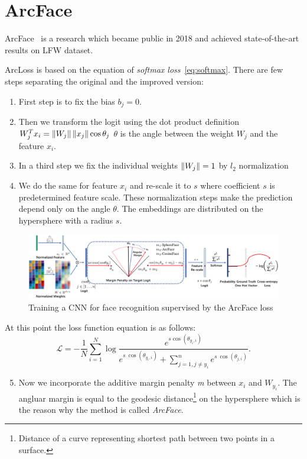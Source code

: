 \chapter{ArcFace}\label{ch:arcface}
ArcFace~\cite{ArcFace} is a research which became public in 2018 and achieved state-of-the-art results on LFW dataset.

ArcLoss is based on the equation of \textit{softmax loss}~\ref{eq:softmax}.
There are few steps separating the original and the improved version:
\begin{enumerate}
    \item First step is to fix the bias $b_j = 0$.
    \item Then we transform the logit using the dot product definition $W_j^T x_i = \left\lVert W_j\right\rVert \left\lVert x_j\right\rVert \cos \theta_j$
    $\theta$ is the angle between the weight $W_j$ and the feature $x_i$.
    \item In a third step we fix the individual weights $\left\lVert W_j\right\rVert = 1$ by $l_2$ normalization
    \item We do the same for feature $x_i$ and re-scale it to $s$ where coefficient $s$ is predetermined feature scale.
    These normalization steps make the prediction depend only on the angle $\theta$.
    The embeddings are distributed on the hypersphere with a radius $s$.
\end{enumerate}

\begin{figure}[H]
    \centering
    \includegraphics[width=\columnwidth]{images/arcface/arcface.png}
    \caption{Training a CNN for face recognition supervised by the ArcFace loss~\cite{ArcFace}}
    \label{fig:arcface}
\end{figure}

At this point the loss function equation is as follows:
\begin{equation}
    \mathcal{L} = -\frac{1}{N} \sum_{i=1}^{N} \log \frac{e^{s \cos(\theta_{y_i,i})}}
    {e^{s\ \cos(\theta_{y_i,i})} + \sum_{j = 1, j \neq y_i}^n e^{s\ \cos(\theta_{j,i})}}.
\end{equation}

\begin{enumerate}
    \setcounter{enumi}{4}
    \item Now we incorporate the additive margin penalty \textit{m} between $x_i$ and $W_{y_i}$.
    The angluar margin is equal to the geodesic distance\footnote{Distance of a curve representing shortest path
    between two points in a surface.} on the hypersphere which is the reason why the method is called
    \textit{ArcFace}.
\end{enumerate}

